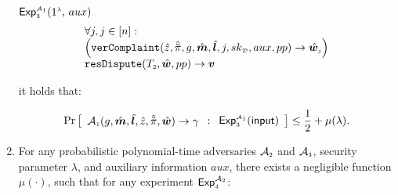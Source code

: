 \begin{definition}[Privacy]
\begin{enumerate}
\begin{center}
\begin{mybox}[colback=white,  width=85mm, height=76mm,]{$\mathsf{Exp}_{\scriptscriptstyle 3}^{\scriptscriptstyle\mathcal{A}_{\scriptscriptstyle 1}}(1^{\scriptscriptstyle\lambda}\text{, }  {aux})$}
$$\begin{array}{l}
%
 \forall j, j\in [n]:\\
\Big(\mathtt{verComplaint}( \hat z, \hat{\ddot{\pi}}, g, \hat{\bm m}, \hat{\bm{l}}, j, sk_{\st\mathcal D}, aux, pp)\rightarrow \hat{\bm{w}}_{\st j}
\Big)
\\
\mathtt{resDispute}(T_{\st 2}, \hat {\bm w}, pp)\rightarrow \bm v
\\
%
%
   \end{array} 
$$
\end{mybox}
\end{center}

it holds that:

$$ \Pr\left[
  \begin{array}{l}
  
 
\mathcal{A}_{\st 1}(g, \hat {\bm m}, \hat{\bm l}, \hat z, \hat{\ddot \pi}, \hat{\bm{w}})\rightarrow \gamma
\end{array} :
    \begin{array}{l}
    \mathsf{Exp}_{\st 3}^{\st\mathcal{A}_{\st 1}}(\mathsf{input})\\
\end{array}    \right]\leq \frac{1}{2}+\mu(\lambda).$$




\item For any probabilistic polynomial-time  adversaries $\mathcal{A}_{\scriptscriptstyle 2}$ and  $\mathcal{A}_{\scriptscriptstyle 3}$, security parameter $\lambda$, and  auxiliary information $aux$, there exists a negligible function $\mu(\cdot)$, such that for any  experiment $\mathsf{Exp}_{\scriptscriptstyle 4}^{\mathcal{A}_{\scriptscriptstyle 2}}$:


\end{enumerate}
\end{definition}
